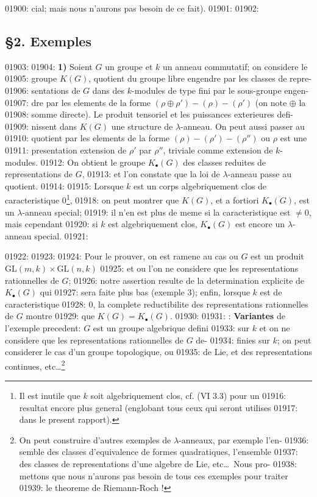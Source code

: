01900: cial; mais nous n'aurons pas besoin de ce fait).
01901: 
01902: \subsection*{\S 2. Exemples}
01903: 
01904: \textbf{1)} Soient $G$ un groupe et $k$ un anneau commutatif; on considere le
01905: groupe $K(G)$, quotient du groupe libre engendre par les classes de repre-
01906: sentations de $G$ dans des $k$-modules de type fini par le sous-groupe engen-
01907: dre par les elements de la forme $(\rho \oplus \rho') - (\rho) - (\rho')$ (on note $\oplus$ la
01908: somme directe). Le produit tensoriel et les puissances exterieures defi-
01909: nissent dans $K(G)$ une structure de $\lambda$-anneau. On peut aussi passer au
01910: quotient par les elements de la forme $(\rho) - (\rho') - (\rho'')$ ou $\rho$ est une
01911: presentation extension de $\rho'$ par $\rho''$, triviale comme extension de $k$-modules.
01912: On obtient le groupe $K_{\bullet}(G)$ des classes reduites de representations de $G$,
01913: et l'on constate que la loi de $\lambda$-anneau passe au quotient.
01914: 
01915: Lorsque $k$ est un corps algebriquement clos de caracteristique 0\footnote{Il est inutile que $k$ soit algebriquement clos, cf. (VI 3.3) pour un
01916: resultat encore plus general (englobant tous ceux qui seront utilises
01917: dans le present rapport).},
01918: on peut montrer que $K(G)$, et a fortiori $K_{\bullet}(G)$, est un $\lambda$-anneau special;
01919: il n'en est plus de meme si la caracteristique est $\neq 0$, mais cependant
01920: si $k$ est algebriquement clos\footnotemark[1], $K_{\bullet}(G)$ est encore un $\lambda$-anneau special.
01921: \addtocounter{footnote}{1}
01922: 
01923: 
01924: Pour le prouver, on est ramene au cas ou $G$ est un produit $\mathrm{GL}(m,k) \times \mathrm{GL}(n,k)$
01925: et ou l'on ne considere que les representations rationnelles de $G$;
01926: notre assertion resulte de la determination explicite de $K_{\bullet}(G)$ qui
01927: sera faite plus bas (exemple 3); enfin, lorsque $k$ est de caracteristique
01928: 0, la complete reductibilite des representations rationnelles de $G$ montre
01929: que $K(G) = K_{\bullet}(G)$.
01930: 
01931: : \textbf{Variantes} de l'exemple precedent: $G$ est un groupe algebrique defini
01933: sur $k$ et on ne considere que les representations rationnelles de $G$ de-
01934: finies sur $k$; on peut considerer le cas d'un groupe topologique, ou
01935: de Lie, et des representations continues, etc\ldots\footnote{On peut construire d'autres exemples de $\lambda$-anneaux, par exemple l'en-
01936: semble des classes d'equivalence de formes quadratiques, l'ensemble
01937: des classes de representations d'une algebre de Lie, etc\ldots\ Nous pro-
01938: mettons que nous n'aurons pas besoin de tous ces exemples pour traiter
01939: le theoreme de Riemann-Roch !}
